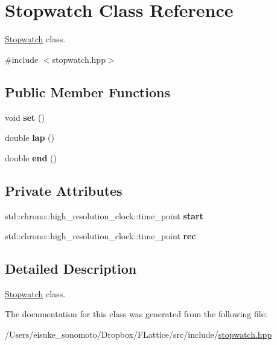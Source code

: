 \hypertarget{class_stopwatch}{}\section{Stopwatch Class Reference}
\label{class_stopwatch}


\mbox{\hyperlink{class_stopwatch}{Stopwatch}} class.  




{\ttfamily \#include $<$stopwatch.\+hpp$>$}

\subsection*{Public Member Functions}
\begin{DoxyCompactItemize}
\item 
\mbox{\label{class_stopwatch_aa58180166145ff2ee3340acf0a1b7f32}} 
void {\bfseries set} ()
\item 
\mbox{\label{class_stopwatch_a8e696ad9d0a92bafbccea81ff317da91}} 
double {\bfseries lap} ()
\item 
\mbox{\label{class_stopwatch_abf9e598738519353a858e962a4dd71a3}} 
double {\bfseries end} ()
\end{DoxyCompactItemize}
\subsection*{Private Attributes}
\begin{DoxyCompactItemize}
\item 
\mbox{\label{class_stopwatch_aedd5e689676ffd17b95e71a876f35a3b}} 
std\+::chrono\+::high\+\_\+resolution\+\_\+clock\+::time\+\_\+point {\bfseries start}
\item 
\mbox{\label{class_stopwatch_ac4b795adfe881690f1d2cd4760f28da1}} 
std\+::chrono\+::high\+\_\+resolution\+\_\+clock\+::time\+\_\+point {\bfseries rec}
\end{DoxyCompactItemize}


\subsection{Detailed Description}
\mbox{\hyperlink{class_stopwatch}{Stopwatch}} class. 

The documentation for this class was generated from the following file\+:\begin{DoxyCompactItemize}
\item 
/\+Users/eisuke\+\_\+sonomoto/\+Dropbox/\+F\+Lattice/src/include/\mbox{\hyperlink{stopwatch_8hpp}{stopwatch.\+hpp}}\end{DoxyCompactItemize}
